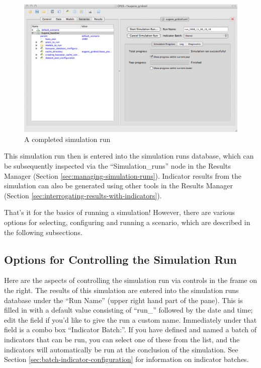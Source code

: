 \begin{figure}[htp]
\begin{center}
\includegraphics[scale=0.4]{part-gui/images/scenario-manager-completed-run.png}
\end{center}
\caption{A completed simulation run}
\label{fig:scenario-manager-completed-run}
\end{figure}

This simulation run then is entered into the simulation runs database,
which can be subsequently inspected via the ``Simulation\_runs'' node in
the Results Manager 
(Section \ref{sec:managing-simulation-runs}).
Indicator results from the simulation can also be generated using other
tools in the Results Manager (Section
\ref{sec:interrogating-results-with-indicators}).

That's it for the basics of running a simulation!  However, there are
various options for selecting, configuring and running a scenario, which
are described in the following subsections.

\subsection{Options for Controlling the Simulation Run}
\label{sec:controlling-simulation}

Here are the aspects of controlling the simulation run via controls in the
frame on the right.  The results of this simulation are entered into the
simulation runs database under the ``Run Name'' (upper right hand part of
the pane).  This is filled in with a default value consisting of ``run\_''
followed by the date and time; edit the field if you'd like to give the run
a custom name.  Immediately under that field is a combo box ``Indicator
Batch:''.  If you have defined and named a batch of indicators that can be
run, you can select one of these from the list, and the indicators will
automatically be run at the conclusion of the simulation.  See Section
\ref{sec:batch-indicator-configuration} for information on indicator
batches.

